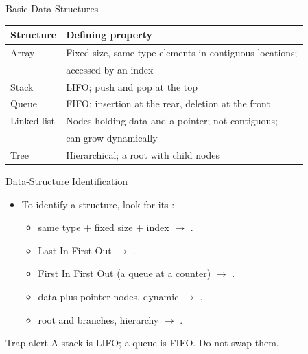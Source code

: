 \documentclass[aspectratio=169]{beamer}
\begin{document}
\begin{frame}{Basic Data Structures}
  \begin{center}
    \begin{tabular}{p{}p{}}
      \toprule
      \textbf{Structure} & \textbf{Defining property} \\
      \midrule
      Array & Fixed-size, same-type elements in contiguous locations; \\
            & accessed by an index \\
      Stack & LIFO; push and pop at the top \\
      Queue & FIFO; insertion at the rear, deletion at the front \\
      Linked list & Nodes holding data and a pointer; not contiguous; \\
                  & can grow dynamically \\
      Tree & Hierarchical; a root with child nodes \\
      \bottomrule
    \end{tabular}
  \end{center}
\end{frame}

\begin{frame}{Data-Structure Identification}
  \begin{itemize}
    \item To identify a structure, look for its :
      \begin{itemize}
        \item same type + fixed size + index $\rightarrow$ .
        \item Last In First Out $\rightarrow$ .
        \item First In First Out (a queue at a counter) $\rightarrow$
          .
        \item data plus pointer nodes, dynamic $\rightarrow$ .
        \item root and branches, hierarchy $\rightarrow$ .
      \end{itemize}
  \end{itemize}
  \begin{alertblock}{Trap alert}
    A stack is LIFO; a queue is FIFO. Do not swap them.
  \end{alertblock}
\end{frame}
\end{document}
